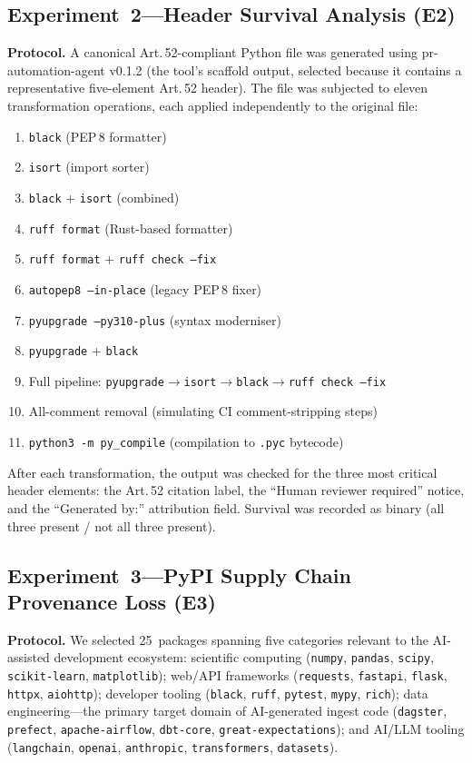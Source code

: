 \documentclass[conference]{IEEEtran}
\begin{document}
\subsection{Experiment~2---Header Survival Analysis (E2)}

\textbf{Protocol.}  A canonical Art.\,52-compliant Python file was
generated using pr-automation-agent v0.1.2 (the tool's scaffold output,
selected because it contains a representative five-element Art.\,52
header).  The file was subjected to eleven transformation operations,
each applied independently to the original file:

\begin{enumerate}
\item \texttt{black} (PEP\,8 formatter)
\item \texttt{isort} (import sorter)
\item \texttt{black} + \texttt{isort} (combined)
\item \texttt{ruff format} (Rust-based formatter)
\item \texttt{ruff format} + \texttt{ruff check --fix}
\item \texttt{autopep8 --in-place} (legacy PEP\,8 fixer)
\item \texttt{pyupgrade --py310-plus} (syntax moderniser)
\item \texttt{pyupgrade} + \texttt{black}
\item Full pipeline: \texttt{pyupgrade}$\to$\texttt{isort}$\to$\texttt{black}$\to$\texttt{ruff check --fix}
\item All-comment removal (simulating CI comment-stripping steps)
\item \texttt{python3 -m py\_compile} (compilation to \texttt{.pyc} bytecode)
\end{enumerate}

After each transformation, the output was checked for the three most
critical header elements: the Art.\,52 citation label, the ``Human
reviewer required'' notice, and the ``Generated by:'' attribution field.
Survival was recorded as binary (all three present / not all three present).

\subsection{Experiment~3---PyPI Supply Chain Provenance Loss (E3)}

\textbf{Protocol.}  We selected 25~packages spanning five categories
relevant to the AI-assisted development ecosystem: scientific computing
(\texttt{numpy}, \texttt{pandas}, \texttt{scipy}, \texttt{scikit-learn},
\texttt{matplotlib}); web/API frameworks (\texttt{requests},
\texttt{fastapi}, \texttt{flask}, \texttt{httpx}, \texttt{aiohttp});
developer tooling (\texttt{black}, \texttt{ruff}, \texttt{pytest},
\texttt{mypy}, \texttt{rich}); data engineering---the primary target
domain of AI-generated ingest code (\texttt{dagster}, \texttt{prefect},
\texttt{apache-airflow}, \texttt{dbt-core},
\texttt{great-expectations}); and AI/LLM tooling (\texttt{langchain},
\texttt{openai}, \texttt{anthropic}, \texttt{transformers},
\texttt{datasets}).
\end{document}
